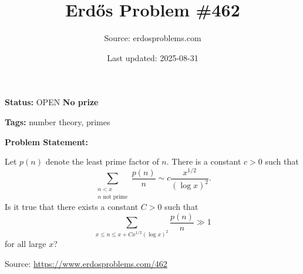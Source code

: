 \documentclass{article}
\title{Erd\H{o}s Problem \#462}
\date{Last updated: 2025-08-31}
\author{Source: erdosproblems.com}
\begin{document}
\maketitle

\noindent\textbf{Status:} OPEN \quad \textbf{No prize}

\noindent\textbf{Tags:} number theory, primes

\medskip
\noindent\textbf{Problem Statement:}

Let $p(n)$ denote the least prime factor of $n$. There is a constant $c>0$ such that\[\sum_{\substack{n<x\\ n\textrm{ not prime}}}\frac{p(n)}{n}\sim c\frac{x^{1/2}}{(\log x)^2}.\]Is it true that there exists a constant $C>0$ such that\[\sum_{x\leq n\leq x+Cx^{1/2}(\log x)^2}\frac{p(n)}{n} \gg 1\]for all large $x$?

\bigskip
\noindent\small{Source: \url{https://www.erdosproblems.com/462}}
\end{document}
